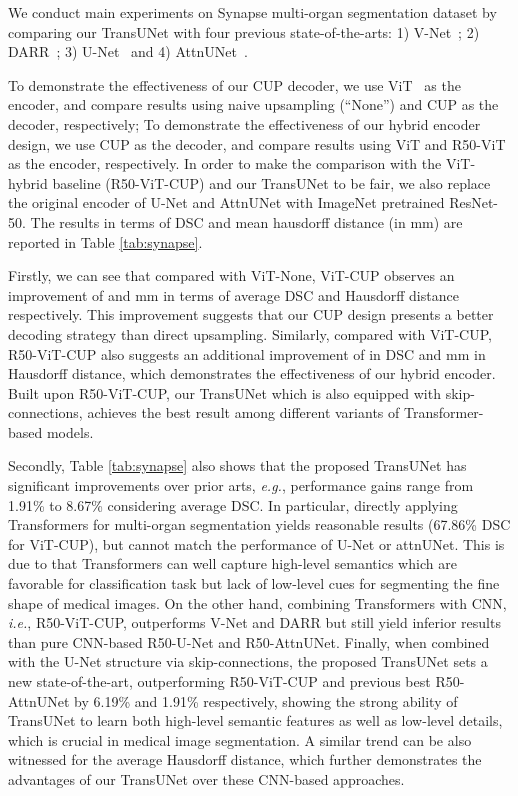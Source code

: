 \documentclass[runningheads]{llncs}
\begin{document}
We conduct main experiments on Synapse multi-organ segmentation dataset by comparing our TransUNet with four previous state-of-the-arts: 1) V-Net~\cite{milletari2016v}; 2) DARR~\cite{fu2020domain}; 3) U-Net~\cite{ronneberger2015u} and 4) AttnUNet~\cite{schlemper2019attention}. 

To demonstrate the effectiveness of our CUP decoder, we use ViT~\cite{dosovitskiy2020image} as the encoder, and compare results using naive upsampling (``None'') and CUP as the decoder, respectively;
To demonstrate the effectiveness of our hybrid encoder design, we use CUP as the decoder, and compare results using ViT and R50-ViT as the encoder, respectively.
In order to make the comparison with the ViT-hybrid baseline (R50-ViT-CUP) and our TransUNet to be fair, we also replace the original encoder of U-Net \cite{ronneberger2015u} and AttnUNet \cite{oktay2018attention} with ImageNet pretrained ResNet-50.
The results in terms of DSC and mean hausdorff distance (in mm) are reported in Table \ref{tab:synapse}. 


Firstly, we can see that compared with ViT-None, ViT-CUP observes an improvement of  and  mm in terms of average DSC and Hausdorff distance respectively. This improvement suggests that our CUP design presents a better decoding strategy than direct upsampling. 
Similarly, compared with ViT-CUP, R50-ViT-CUP also suggests an additional improvement of  in DSC and  mm in Hausdorff distance, which demonstrates the effectiveness of our hybrid encoder.
Built upon R50-ViT-CUP, our TransUNet which is also equipped with skip-connections,  achieves the best result among different variants of Transformer-based models.


Secondly, Table \ref{tab:synapse} also shows that the proposed TransUNet has significant improvements over prior arts, \emph{e.g.}, performance gains range from 1.91\% to 8.67\% considering average DSC. 
In particular, directly applying Transformers for multi-organ segmentation yields reasonable results (67.86\% DSC for ViT-CUP), but cannot match the performance of U-Net or attnUNet. 
This is due to that Transformers can well capture high-level semantics which are favorable for classification task but lack of low-level cues for segmenting the fine shape of medical images. 
On the other hand, combining Transformers with CNN, \emph{i.e.}, R50-ViT-CUP, outperforms V-Net and DARR but still yield inferior results than pure CNN-based R50-U-Net and R50-AttnUNet. Finally, when combined with the U-Net structure via skip-connections, the proposed TransUNet sets a new state-of-the-art, outperforming R50-ViT-CUP and previous best R50-AttnUNet by 6.19\% and 1.91\% respectively, showing the strong ability of TransUNet to learn both high-level semantic features as well as low-level details, which is crucial in medical image segmentation.
A similar trend can be also witnessed for the average Hausdorff distance, which further demonstrates the advantages of our TransUNet over these CNN-based approaches.
\end{document}
